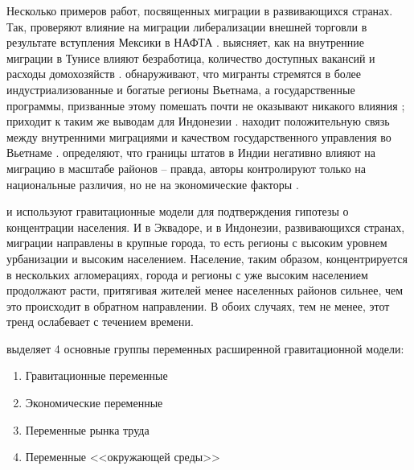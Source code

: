 \documentclass[a4paper,12pt]{article}
\begin{document}
Несколько примеров работ, посвященных миграции в развивающихся странах. Так, \citeauthor{mexico_2013} проверяют влияние на миграции либерализации внешней торговли в результате вступления Мексики в НАФТА \citep{mexico_2013}.
\citeauthor{tunis_2018} выясняет, как на внутренние миграции в Тунисе влияют безработица, количество доступных вакансий и расходы домохозяйств \citep{tunis_2018}.
\citeauthor{vietnam_1997} обнаруживают, что мигранты стремятся в более индустриализованные и богатые регионы Вьетнама, а государственные программы, призванные этому помешать почти не оказывают никакого влияния \citep{vietnam_1997}; \citeauthor{indonesia_2012} приходит к таким же выводам для Индонезии \citep{indonesia_2012}.
\citeauthor{vietnam_2020} находит положительную связь между внутренними миграциями и качеством государственного управления во Вьетнаме \citep{vietnam_2020}.
\citeauthor{india_2018} определяют, что границы штатов в Индии негативно влияют на миграцию в масштабе районов -- правда, авторы контролируют только на национальные различия, но не на экономические факторы \citep{india_2018}.

\citeauthor{indonesia_2017} и \citeauthor{equador_2018} используют гравитационные модели для подтверждения гипотезы о концентрации населения. И в Эквадоре, и в Индонезии, развивающихся странах, миграции направлены в крупные города, то есть регионы с высоким уровнем урбанизации и высоким населением. 
Население, таким образом, концентрируется в нескольких агломерациях, города и регионы с уже высоким населением продолжают расти, притягивая жителей менее населенных районов сильнее, чем это происходит в обратном направлении. 
В обоих случаях, тем не менее, этот тренд ослабевает с течением времени.


\citet{etzo_internal_2008} выделяет 4 основные группы переменных расширенной гравитационной модели:
\begin{enumerate}
	\item Гравитационные переменные
	\item Экономические переменные
	\item Переменные рынка труда
	\item Переменные <<окружающей среды>>
\end{enumerate}
\end{document}
